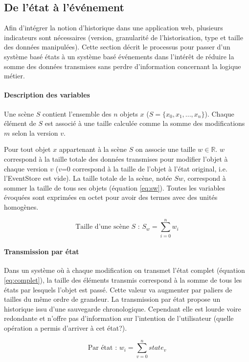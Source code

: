 \subsection{De l'état à l'événement}
\label{sec:statetoevent}
Afin d'intégrer la notion d'historique dans une application web, plusieurs indicateurs 
sont nécessaires (version, granularité de l'historisation, type et taille des données 
manipulées). Cette section décrit le processus pour passer d'un système basé 
états à un système basé événements dans l'intérêt de réduire la somme des 
données transmises sans perdre d'information concernant la logique métier.
\paragraph{Description des variables}
Une scène $S$ contient l'ensemble des $n$ objets $x$ ($S =\{x_0,x_1,...,x_n\}$). 
Chaque élément de $S$ est associé à une taille calculée comme la somme des 
modifications $m$ selon la version $v$. 

Pour tout objet $x$ appartenant à la scène $S$ on associe une taille $w \in 
\mathbb{R}$. $w$ correspond à la taille totale des données transmises pour 
modifier l'objet à chaque version $v$ ($v$=0 correspond à la taille de l'objet à l'état 
original, i.e. l'\gls{EventStore} est vide). La taille totale de la scène, notée $Sw$, 
correspond à sommer la taille de tous ses objets (équation \ref{eq:sw}). Toutes les 
variables évoquées sont exprimées en octet pour avoir des termes avec des 
unités homogènes.

\begin{equation}
\label{eq:sw}
\text{Taille d'une scène $S$ : } S_w= \sum_{i=0}^{n}w_i
\end{equation}


\paragraph{Transmission par état}
Dans un système où à chaque modification on transmet l'état complet (équation 
\ref{eq:complet}), la taille des éléments transmis correspond à la somme de tous 
les états par lesquels l'objet est passé. Cette valeur va augmenter par paliers de 
tailles du même ordre de grandeur.
La transmission par état propose un historique issu d'une sauvegarde 
chronologique. Cependant elle est lourde voire redondante et n'offre pas 
d'information sur l'intention de l'utilisateur (quelle opération a permis d'arriver à cet 
état?).

\begin{equation}
\label{eq:complet}
\text{Par état : } w_i = \sum_{v=0}^{n}state_{v}
\end{equation}


